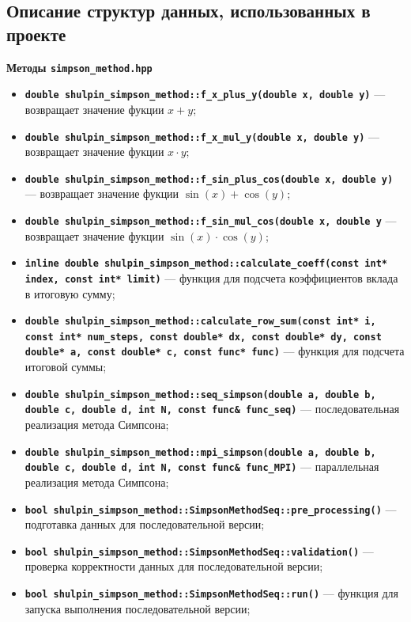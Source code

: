 \documentclass[12pt,a4paper]{article}
\begin{document}
\subsection*{Описание структур данных, использованных в проекте}
\textbf{Методы \texttt{simpson\_method.hpp}}
\begin{itemize}
    \item \textbf{\texttt{double shulpin\_simpson\_method::f\_x\_plus\_y(double x, double y)}} --- возвращает значение фукции $x + y$;
    \item \textbf{\texttt{double shulpin\_simpson\_method::f\_x\_mul\_y(double x, double y)}} --- возвращает значение фукции $x \cdot y$;
    \item \textbf{\texttt{double shulpin\_simpson\_method::f\_sin\_plus\_cos(double x, double y)}} --- возвращает значение фукции $\sin(x) + \cos(y)$;
    \item \textbf{\texttt{double shulpin\_simpson\_method::f\_sin\_mul\_cos(double x, double y}} --- возвращает значение фукции $\sin(x) \cdot \cos(y)$;
    \item \textbf{\texttt{inline double shulpin\_simpson\_method::calculate\_coeff(const int* index, const int* limit)}} --- функция для подсчета коэффициентов вклада в итоговую сумму;
    \item \textbf{\texttt{double shulpin\_simpson\_method::calculate\_row\_sum(const int* i, const int* num\_steps, const double* dx, const double* dy, const double* a, const double* c, const func* func)}} --- функция для подсчета итоговой суммы;
    \item \textbf{\texttt{double shulpin\_simpson\_method::seq\_simpson(double a, double b, double c, double d, int N, const func\& func\_seq)}} --- последовательная реализация метода Симпсона;
    \item \textbf{\texttt{double shulpin\_simpson\_method::mpi\_simpson(double a, double b, double c, double d, int N, const func\& func\_MPI)}} --- параллельная реализация метода Симпсона;
    \item \textbf{\texttt{bool shulpin\_simpson\_method::SimpsonMethodSeq::pre\_processing()}} --- подготавка данных для последовательной версии;
    \item \textbf{\texttt{bool shulpin\_simpson\_method::SimpsonMethodSeq::validation()}} --- проверка корректности данных для последовательной версии;
    \item \textbf{\texttt{bool shulpin\_simpson\_method::SimpsonMethodSeq::run()}} --- функция для запуска выполнения последовательной версии;

\end{itemize}
\end{document}
